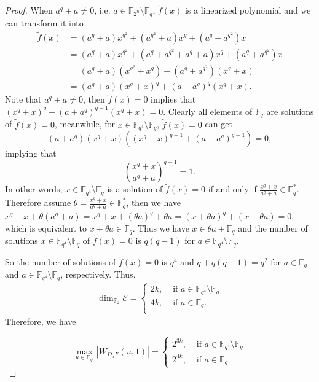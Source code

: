 \documentclass[12 pt]{article}
\def\F{{\mathbb F}}
\begin{document}
\begin{proof}
    When $ a^q+a\ne 0 $, i.e. $ a\in\F_{2^n}\setminus\F_q $, 
    $ \widetilde{f}(x) $ is a linearized polynomial and we can transform it into 
    \begin{align*}
    \widetilde{f}(x)&=\left( a^{q}+a \right)x^{q^2}+\left( a^{q^2}+a \right)x^{q }+\left( a^{q }+a^{q^2} \right)x \\
                    &=\left( a^{q}+a \right)x^{q^2}+\left( a^q+a^{q^2}+a^q+a \right)x^{q }+\left( a^{q }+a^{q^2} \right)x \\
                    &=\left( a^{q}+a \right)\left( x^{q^2}+x^q \right)+\left( a^{q }+a^{q^2} \right)\left( x^q+x \right) \\
                    &=\left( a^{q}+a \right)\left( x^{q}+x \right)^q+\left( a+a^{q} \right)^q\left( x^q+x \right). 
    \end{align*}
    Note that $ a^q+a\ne 0 $, then $ \widetilde{f}(x)=0 $ implies that $ \left( x^{q}+x \right)^q+\left( a+a^{q} \right)^{q-1}\left( x^q+x \right)=0 $. Clearly all elements of $ \F_q $ are solutions of $ \widetilde{f}(x)=0 $, meanwhile, for $ x\in\F_{q^4}\setminus\F_q $, $ \widetilde{f}(x)=0 $ can get 
    \[\left( a+a^{q} \right)\left( x^q+x \right)\left( \left( x^q+x \right)^{q-1}+\left( a+a^q \right)^{q-1} \right)=0,\]
    implying that 
    \[\left( \frac{x^q+x}{a^q+a}  \right)^{q-1}=1.\]
    In other words, $ x\in\F_{q^4}\setminus\F_q $ is a solution of $ \widetilde{f}(x)=0 $ 
    if and only if $ \frac{x^q+x}{a^q+a}\in\F_q^* $. 
    Therefore assume $ \theta = \frac{x^q+x}{a^q+a}\in\F_q^* $, then we have $ x^q+x+\theta(a^q+a)=x^q+x+(\theta a)^q+\theta a=(x+\theta a)^q+(x+\theta a)=0 $, 
    which is equivalent to $ x+\theta a\in\F_q $. Thus we have $ x\in \theta a+\F_q $ 
    and the number of solutions $ x\in\F_{q^4}\setminus\F_q $ of $ \widetilde{f}(x)=0 $ is $ q(q-1) $ for $ a\in\F_{q^4}\setminus\F_q $.
    
    So the number of solutions of $ \widetilde{f}(x)=0 $ is $ q^4 $ 
    and $ q+q(q-1)=q^2 $ for $ a\in\F_q $ and  $ a\in\F_{q^4}\setminus\F_q $, respectively. 
    Thus,  
    \begin{align*}
      \dim_{\F_2}\mathcal{E}=\begin{cases}
        2k,&\text{~if~}a\in\F_{q^4}\setminus\F_q\\
        4k,&\text{~if~}a\in\F_q.\\
      \end{cases}
    \end{align*}
    Therefore, we have 
    
    \begin{equation*}
      \max_{u\in\F_{q^4}}\left\lvert W_{D_aF}(u,1)\right\rvert=\begin{cases}
        2^{3k},&\text{~if~}a\in\F_{q^4}\setminus\F_q\\
        2^{4k},&\text{~if~}a\in\F_{q}
      \end{cases}
    \end{equation*}
  \end{proof}
\end{document}
